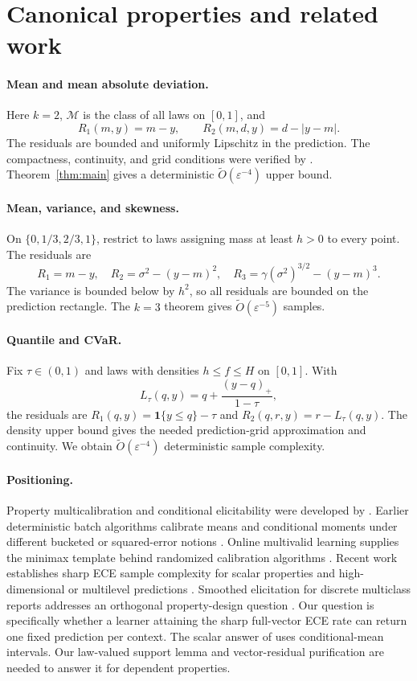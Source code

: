 \documentclass{article}
\theoremstyle{definition}
\theoremstyle{remark}
\newcommand{\1}{\mathbf 1}
\newcommand{\cM}{\mathcal M}
\begin{document}
\section{Canonical properties and related work}

\paragraph{Mean and mean absolute deviation.} Here $k=2$, $\cM$ is the class of all laws on $[0,1]$, and
\[
R_1(m,y)=m-y,\qquad R_2(m,d,y)=d-|y-m|.
\]
The residuals are bounded and uniformly Lipschitz in the prediction. The compactness, continuity, and grid conditions were verified by \citet{lu2026multilevel}. Theorem~\ref{thm:main} gives a deterministic $\widetilde O(\varepsilon^{-4})$ upper bound.

\paragraph{Mean, variance, and skewness.} On $\{0,1/3,2/3,1\}$, restrict to laws assigning mass at least $h>0$ to every point. The residuals are
\[
R_1=m-y,\quad R_2=\sigma^2-(y-m)^2,\quad
R_3=\gamma(\sigma^2)^{3/2}-(y-m)^3.
\]
The variance is bounded below by $h^2$, so all residuals are bounded on the prediction rectangle. The $k=3$ theorem gives $\widetilde O(\varepsilon^{-5})$ samples.

\paragraph{Quantile and CVaR.} Fix $\tau\in(0,1)$ and laws with densities $h\le f\le H$ on $[0,1]$. With
\[
L_\tau(q,y)=q+\frac{(y-q)_+}{1-\tau},
\]
the residuals are $R_1(q,y)=\1\{y\le q\}-\tau$ and $R_2(q,r,y)=r-L_\tau(q,y)$. The density upper bound gives the needed prediction-grid approximation and continuity. We obtain $\widetilde O(\varepsilon^{-4})$ deterministic sample complexity.

\paragraph{Positioning.} Property multicalibration and conditional elicitability were developed by \citet{noarovroth2023scope}. Earlier deterministic batch algorithms calibrate means and conditional moments under different bucketed or squared-error notions \citep{jung2021moment}. Online multivalid learning supplies the minimax template behind randomized calibration algorithms \citep{gupta2022online}. Recent work establishes sharp ECE sample complexity for scalar properties \citep{collina2026sample} and high-dimensional or multilevel predictions \citep{noarov2025highdim,lu2026multilevel}. Smoothed elicitation for discrete multiclass reports addresses an orthogonal property-design question \citep{finocchiaro2026smoothed}. Our question is specifically whether a learner attaining the sharp full-vector ECE rate can return one fixed prediction per context. The scalar answer of \citet{noarovroth2026deterministic} uses conditional-mean intervals. Our law-valued support lemma and vector-residual purification are needed to answer it for dependent properties.
\end{document}
